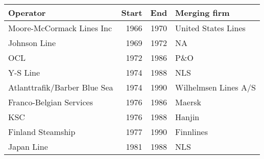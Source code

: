 
\begin{tabular}[t]{lrrl}
\toprule
Operator & Start & End & Merging firm\\
\midrule
Moore-McCormack Lines Inc & 1966 & 1970 & United States Lines\\
Johnson Line & 1969 & 1972 & NA\\
OCL & 1972 & 1986 & P\&O\\
Y-S Line & 1974 & 1988 & NLS\\
Atlanttrafik/Barber Blue Sea & 1974 & 1990 & Wilhelmsen Lines A/S\\
Franco-Belgian Services & 1976 & 1986 & Maersk\\
KSC & 1976 & 1988 & Hanjin\\
Finland Steamship & 1977 & 1990 & Finnlines\\
Japan Line & 1981 & 1988 & NLS\\
\bottomrule
\end{tabular}
